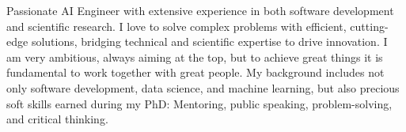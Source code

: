 Passionate AI Engineer with extensive experience in both software development and scientific research. I love to solve complex problems with efficient, cutting-edge solutions, bridging technical and scientific expertise to drive innovation.
I am very ambitious, always aiming at the top, but to achieve great things it is fundamental to work together with great people.
My background includes not only software development, data science, and machine learning, but also precious soft skills earned during my PhD: Mentoring, public speaking, problem-solving, and critical thinking.